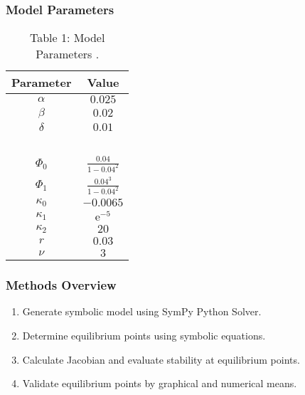 \documentclass{beamer}
\begin{document}
\begin{frame}
\frametitle{Model Parameters}
\vspace{-5mm}
\begin{table}
\caption{Table 1: Model Parameters \citep{p5}.}
\centering
\begin{tabular}{|c|c|}
\hline
\textbf{Parameter }     & \textbf{Value}         \\
\hline
$\alpha$                & $0.025$                       \\ [-0.3em]
$\beta$                 & $0.02$                        \\ [-0.3em]
$\delta$                & $0.01$                        \\ [-0.1em]\hline
~                       & ~                             \\ [-1em]
$\Phi_0$                & $\frac{0.04}{1-0.04^2}$       \\ [0.3em]
$\Phi_1$                & $\frac{0.04^3}{1-0.04^2}$     \\ [0.3em] \hline
$\kappa_0$              & $-0.0065$                     \\ [-0.2em]
$\kappa_1$              & $\mathrm e^{-5}$              \\ [-0.2em]
$\kappa_2$              & $20$                          \\ [-0.1em]\hline
$r$                     & $0.03$                        \\ [-0.3em]
$\nu$                   & $3$                           \\
\hline
\end{tabular}
\end{table}
\end{frame}

\begin{frame}
\frametitle{Methods Overview}
\begin{enumerate}
    \setlength\itemsep{2em}
    \item Generate symbolic model using SymPy Python Solver.
    \item Determine equilibrium points using symbolic equations.
    \item Calculate Jacobian and evaluate stability at equilibrium points.
    \item Validate equilibrium points by graphical and numerical means.
\end{enumerate}
\end{frame}
\end{document}

